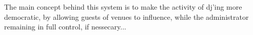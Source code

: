 The main concept behind this system is to make the activity of dj'ing more democratic, by allowing guests of venues to influence, while the administrator remaining in full control, if nessecary... 
